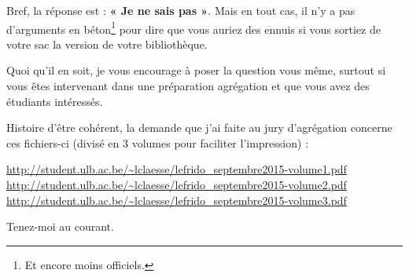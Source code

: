 Bref, la réponse est : \textbf{« Je ne sais pas »}. Mais en tout cas, il n'y a pas d'arguments en béton\footnote{Et encore moins officiels.} pour dire que vous auriez des ennuis si vous sortiez de votre sac la version de votre bibliothèque.

Quoi qu'il en soit, je vous encourage à poser la question vous même, surtout si vous êtes intervenant dans une préparation agrégation et que vous avez des étudiants intéressés.

Histoire d'être cohérent, la demande que j'ai faite au jury d'agrégation concerne ces fichiers-ci (divisé en 3 volumes pour faciliter l'impression) :
\begin{center}
    \url{http://student.ulb.ac.be/~lclaesse/lefrido_septembre2015-volume1.pdf}\\
    \url{http://student.ulb.ac.be/~lclaesse/lefrido_septembre2015-volume2.pdf}\\
    \url{http://student.ulb.ac.be/~lclaesse/lefrido_septembre2015-volume3.pdf}
\end{center}

Tenez-moi au courant. 

